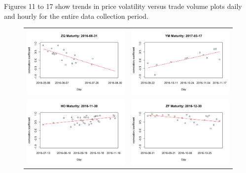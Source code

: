 \documentclass[12pt]{article}
\begin{document}
Figures 11 to 17 show trends in price volatility versus trade volume plots daily and hourly for the entire data collection period.
\begin{figure}[H]
	\begin{center}
		\begin{tabular}{ll}
			\includegraphics[width=8cm]{Coeff_fitZQ2016-08-31.png} &
			\includegraphics[width=8cm]{Coeff_fitYM2017-03-17.png}\\ 
			\includegraphics[width=8cm]{Coeff_fitHO2016-11-30.png} &
			\includegraphics[width=8cm]{Coeff_fitZF2016-12-30.png}\\

\end{tabular}
\end{center}
\end{figure}
\end{document}
